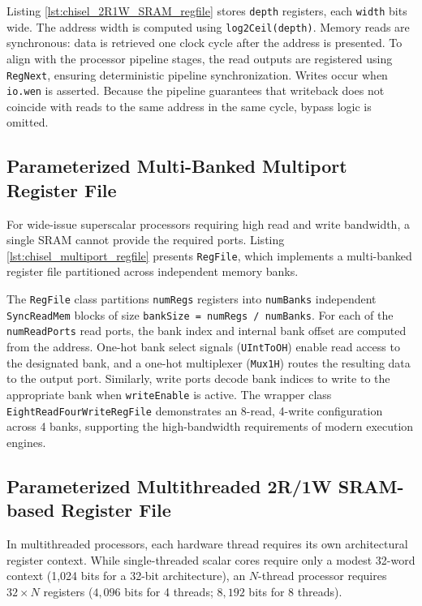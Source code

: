 {Listing \ref{lst:chisel_2R1W_SRAM_regfile} stores \texttt{depth} registers, each \texttt{width} bits wide. The address width is computed using \texttt{log2Ceil(depth)}. Memory reads are synchronous: data is retrieved one clock cycle after the address is presented. To align with the processor pipeline stages, the read outputs are registered using \texttt{RegNext}, ensuring deterministic pipeline synchronization. Writes occur when \texttt{io.wen} is asserted. Because the pipeline guarantees that writeback does not coincide with reads to the same address in the same cycle, bypass logic is omitted.



\subsection{Parameterized Multi-Banked Multiport Register File} \label{subsec:regfile_multiport}
For wide-issue superscalar processors requiring high read and write bandwidth, a single SRAM cannot provide the required ports. Listing \ref{lst:chisel_multiport_regfile} presents \texttt{RegFile}, which implements a multi-banked register file partitioned across independent memory banks.


The \texttt{RegFile} class partitions \texttt{numRegs} registers into \texttt{numBanks} independent \texttt{SyncReadMem} blocks of size \texttt{bankSize = numRegs / numBanks}. For each of the \texttt{numReadPorts} read ports, the bank index and internal bank offset are computed from the address. One-hot bank select signals (\texttt{UIntToOH}) enable read access to the designated bank, and a one-hot multiplexer (\texttt{Mux1H}) routes the resulting data to the output port. Similarly, write ports decode bank indices to write to the appropriate bank when \texttt{writeEnable} is active. The wrapper class \texttt{EightReadFourWriteRegFile} demonstrates an 8-read, 4-write configuration across 4 banks, supporting the high-bandwidth requirements of modern execution engines.
}%


\subsection{Parameterized Multithreaded 2R/1W SRAM-based Register File} \label{subsec:regfile_MT_2R1W_SRAM}
In multithreaded processors, each hardware thread requires its own architectural register context. While single-threaded scalar cores require only a modest 32-word context (1,024 bits for a 32-bit architecture), an $N$-thread processor requires $32 \times N$ registers ($4,096$ bits for 4 threads; $8,192$ bits for 8 threads). 

